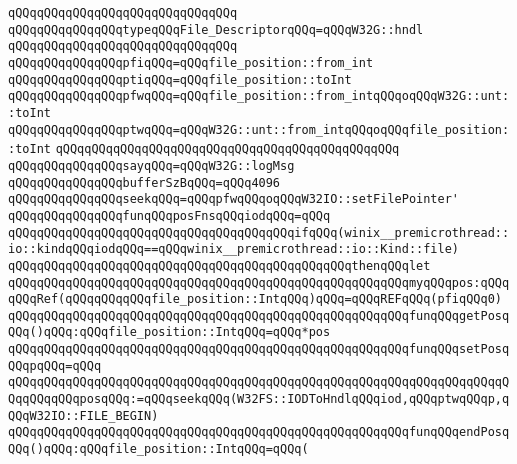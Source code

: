 \verb|qQQqqQQqqQQqqQQqqQQqqQQqqQQqqQQq|\newline
\verb|qQQqqQQqqQQqqQQqtypeqQQqFile_DescriptorqQQq=qQQqW32G::hndl|\newline
\verb|qQQqqQQqqQQqqQQqqQQqqQQqqQQqqQQq|\newline
\verb|qQQqqQQqqQQqqQQqpfiqQQq=qQQqfile_position::from_int|\newline
\verb|qQQqqQQqqQQqqQQqptiqQQq=qQQqfile_position::toInt|\newline
\verb|qQQqqQQqqQQqqQQqpfwqQQq=qQQqfile_position::from_intqQQqoqQQqW32G::unt::toInt|\newline
\verb|qQQqqQQqqQQqqQQqptwqQQq=qQQqW32G::unt::from_intqQQqoqQQqfile_position::toInt|\newline
\verb|qQQqqQQqqQQqqQQqqQQqqQQqqQQqqQQqqQQqqQQqqQQqqQQq|\newline
\verb|qQQqqQQqqQQqqQQqsayqQQq=qQQqW32G::logMsg|\newline
\newline
\verb|qQQqqQQqqQQqqQQqbufferSzBqQQq=qQQq4096|\newline
\newline
\verb|qQQqqQQqqQQqqQQqseekqQQq=qQQqpfwqQQqoqQQqW32IO::setFilePointer'|\newline
\newline
\verb|qQQqqQQqqQQqqQQqfunqQQqposFnsqQQqiodqQQq=qQQq|\newline
\verb|qQQqqQQqqQQqqQQqqQQqqQQqqQQqqQQqqQQqqQQqifqQQq(winix__premicrothread::io::kindqQQqiodqQQq==qQQqwinix__premicrothread::io::Kind::file)|\newline
\verb|qQQqqQQqqQQqqQQqqQQqqQQqqQQqqQQqqQQqqQQqqQQqqQQqthenqQQqlet|\newline
\verb|qQQqqQQqqQQqqQQqqQQqqQQqqQQqqQQqqQQqqQQqqQQqqQQqqQQqqQQqmyqQQqpos:qQQqqQQqRef(qQQqqQQqqQQqfile_position::IntqQQq)qQQq=qQQqREFqQQq(pfiqQQq0)|\newline
\verb|qQQqqQQqqQQqqQQqqQQqqQQqqQQqqQQqqQQqqQQqqQQqqQQqqQQqqQQqfunqQQqgetPosqQQq()qQQq:qQQqfile_position::IntqQQq=qQQq*pos|\newline
\verb|qQQqqQQqqQQqqQQqqQQqqQQqqQQqqQQqqQQqqQQqqQQqqQQqqQQqqQQqfunqQQqsetPosqQQqpqQQq=qQQq|\newline
\verb|qQQqqQQqqQQqqQQqqQQqqQQqqQQqqQQqqQQqqQQqqQQqqQQqqQQqqQQqqQQqqQQqqQQqqQQqqQQqqQQqposqQQq:=qQQqseekqQQq(W32FS::IODToHndlqQQqiod,qQQqptwqQQqp,qQQqW32IO::FILE_BEGIN)|\newline
\verb|qQQqqQQqqQQqqQQqqQQqqQQqqQQqqQQqqQQqqQQqqQQqqQQqqQQqqQQqfunqQQqendPosqQQq()qQQq:qQQqfile_position::IntqQQq=qQQq(|\newline
